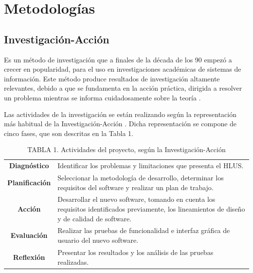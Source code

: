 \documentclass[conference]{IEEEtran}
\begin{document}
\section{Metodolog\'{i}as}

	\subsection{Investigaci\'{o}n-Acci\'{o}n}
		Es un m\'{e}todo de investigaci\'{o}n que a finales de la d\'{e}cada de los 90 empez\'{o} a crecer en popularidad, para el uso en investigaciones acad\'{e}micas de sistemas de informaci\'{o}n. Este m\'{e}todo produce resultados de investigaci\'{o}n altamente relevantes, debido a que se fundamenta en la acci\'{o}n pr\'{a}ctica, dirigida a resolver un problema mientras se informa cuidadosamente sobre la teor\'{i}a \cite{Baskerville}.
		
		Las actividades de la investigaci\'{o}n se est\'{a}n realizando seg\'{u}n la representaci\'{o}n m\'{a}s habitual de la Investigaci\'{o}n-Acci\'{o}n \cite{Baskerville}. Dicha representaci\'{o}n se compone de cinco fases, que son descritas en la Tabla 1.
		
		\FloatBarrier %
		\vfill
		\begin{table}[htb]
			\caption{TABLA 1. Actividades del proyecto, seg\'{u}n la Investigaci\'{o}n-Acci\'{o}n}
			\label{tabla_1}
			\centering
			\setlength{\extrarowheight}{2.5pt}
			\begin{tabulary}{8.8cm}{|c|J|}
				\hline
				 & \\ \hline
				\textbf{Diagn\'{o}stico} & Identificar los problemas y limitaciones que presenta el HLUS.\\ \hline
				\textbf{Planificaci\'{o}n} & Seleccionar la metodolog\'{i}a de desarrollo, determinar los requisitos del software y realizar un plan de trabajo.
\\ \hline
				\textbf{Acci\'{o}n} & Desarrollar el nuevo software, tomando en cuenta los requisitos identificados previamente, los lineamientos de dise\~{n}o y de calidad de software.\\ \hline
				\textbf{Evaluaci\'{o}n} & Realizar las pruebas de funcionalidad e interfaz gr\'{a}fica de usuario del nuevo software.\\ \hline
				\textbf{Reflexi\'{o}n} & Presentar los resultados y los an\'{a}lisis de las pruebas realizadas.\\ \hline
			\end{tabulary}
		\end{table}
		\vfill
		\FloatBarrier %
\end{document}
